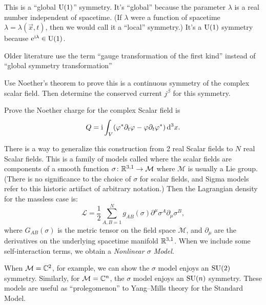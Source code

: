 \begin{remark}
This is a ``global $\operatorname{U}(1)$'' symmetry. It's ``global'' because the
parameter $\lambda$ is a real number independent of spacetime. (If
$\lambda$ were a function of spacetime $\lambda=\lambda(\vec{x},t)$,
then we would call it a ``local'' symmetry.) It's a $\operatorname{U}(1)$ symmetry
because $\mathrm{e}^{\mathrm{i}\lambda}\in\operatorname{U}(1)$.

Older literature use the term ``gauge transformation of the first kind''
instead of ``global symmetry transformation''
\end{remark}

\begin{exercise}
Use Noether's theorem to prove this is a continuous symmetry of the
complex scalar field. Then determine the conserved current $j^{\beta}$
for this symmetry.
\end{exercise}
\begin{exercise}
Prove the Noether charge for the complex Scalar field is
\begin{equation}
Q = \mathrm{i}\int_{V}(\varphi^{*}\partial_{t}\varphi-\varphi\partial_{t}\varphi^{*})\,\mathrm{d}^{3}x.
\end{equation}
\end{exercise}

There is a way to generalize this construction from 2 real Scalar fields
to $N$ real Scalar fields. This is a family of models called
 where the scalar fields are components of a smooth
function $\sigma\colon\mathbb{R}^{3,1}\to\mathcal{M}$ where $\mathcal{M}$ is
usually a Lie group. (There is no significance to the choice of $\sigma$
for scalar fields, and Sigma models refer to this historic artifact of
arbitrary notation.) Then the Lagrangian density for the massless case
is:
\begin{equation}
\mathcal{L} = \frac{1}{2}\sum^{N}_{A,B=1}g_{AB}(\sigma)\partial^{\mu}\sigma^{A}\partial_{\mu}\sigma^{B},
\end{equation}
where $G_{AB}(\sigma)$ is the metric tensor on the field space $\mathcal{M}$,
and $\partial_{\mu}$ are the derivatives on the underlying spacetime
manifold $\mathbb{R}^{3,1}$. When we include some self-interaction terms, we
obtain a \emph{Nonlinear $\sigma$ Model}.

When $\mathcal{M}=\mathbb{C}^{2}$, for example, we can show the $\sigma$ model
enjoys an $\operatorname{SU}(2)$ symmetry. Similarly, for $\mathcal{M}=\mathbb{C}^{n}$, the
$\sigma$ model enjoys an $\operatorname{SU}(n)$ symmetry. These models are useful as
``prolegomenon'' to Yang--Mills theory for the Standard Model.

